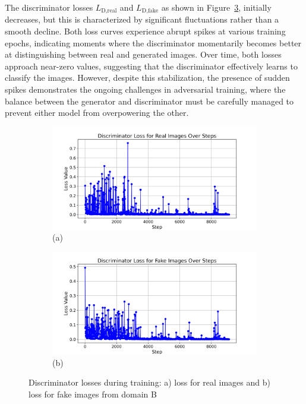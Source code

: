 \documentclass[12pt,DIV14,BCOR12mm,a4paper,footinclude=false,headinclude,parskip=half-,twoside,openright,cleardoublepage=empty,toc=index,bibliography=totoc,listof=totoc]{scrreprt}
\numberwithin{equation}{chapter}
\begin{document}
The discriminator losses $L_{\text{D}, \text{real}}$ and $L_{\text{D}, \text{fake}}$ as shown in Figure~\ref{fig:discriminator_losses}, initially decreases, but this is characterized by significant fluctuations rather than a smooth decline. Both loss curves experience abrupt spikes at various training epochs, indicating moments where the discriminator momentarily becomes better at distinguishing between real and generated images. Over time, both losses approach near-zero values, suggesting that the discriminator effectively learns to classify the images. However, despite this stabilization, the presence of sudden spikes demonstrates the ongoing challenges in adversarial training, where the balance between the generator and discriminator must be carefully managed to prevent either model from overpowering the other.
\begin{figure}
    \centering
    \begin{subfigure}[b]{1.0\textwidth}
        \includegraphics[width=\linewidth]{../media/discriminator_loss_real.png}
        \caption*{(a)}
        \label{fig:dB_loss_real}
    \end{subfigure}

    \begin{subfigure}[b]{1.0\textwidth}
        \includegraphics[width=\linewidth]{../media/discriminator_loss_fake.png}
        \caption*{(b)}
        \label{fig:dB_loss_fake}
    \end{subfigure}

    \caption{Discriminator losses during training: a) loss for real images and b) loss for fake images from domain B}
    \label{fig:discriminator_losses}
\end{figure}
\end{document}
